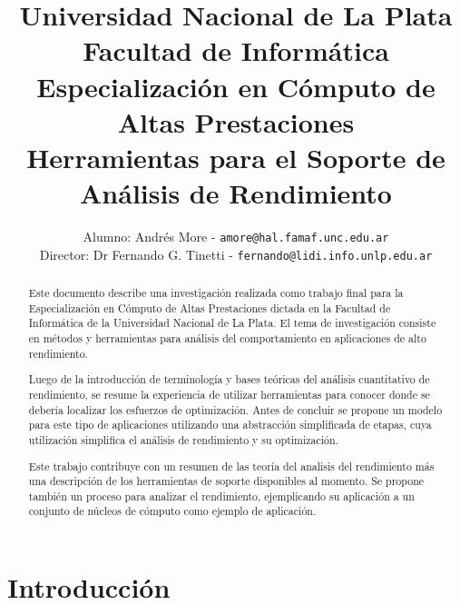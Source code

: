 \documentclass[a4paper]{report}
\begin{document}
\title{Universidad Nacional de La Plata\\Facultad de Inform\'atica\\ \bigskip
  Especializaci\'on en C\'omputo de Altas Prestaciones\\ \bigskip
  Herramientas para el Soporte de An\'alisis de Rendimiento}

\author{
  Alumno: Andr\'es More - {\tt amore@hal.famaf.unc.edu.ar}\\
  Director: Dr Fernando G. Tinetti - {\tt fernando@lidi.info.unlp.edu.ar}
}


\maketitle

\begin{abstract}

  Este documento describe una investigaci\'on realizada como trabajo final para
  la Especializaci\'on en C\'omputo de Altas Prestaciones dictada en la
  Facultad de Inform\'atica de la Universidad Nacional de La Plata.
  El tema de investigaci\'on consiste en m\'etodos y herramientas para
  an\'alisis del comportamiento en aplicaciones de alto rendimiento.

  \bigskip

  Luego de la introducci\'on de terminolog\'ia y bases te\'oricas del
  an\'alisis cuantitativo de rendimiento, se resume la experiencia de utilizar
  herramientas para conocer donde se deber\'ia localizar los esfuerzos de
  optimizaci\'on. Antes de concluir se propone un modelo para este tipo de
  aplicaciones utilizando una abstracci\'on simplificada de etapas, cuya
  utilizaci\'on simplifica el an\'alisis de rendimiento y su optimizaci\'on.

  \bigskip

  Este trabajo contribuye con un resumen de las teor\'ia del analisis del
  rendimiento m\'as una descripci\'on de los herramientas de soporte 
  disponibles al momento. Se propone tambi\'en un proceso para analizar el
  rendimiento, ejemplicando su aplicaci\'on a un conjunto de n\'ucleos de
  c\'omputo como ejemplo de aplicaci\'on.

\end{abstract}

\tableofcontents

\chapter{Introducci\'on}
\end{document}
